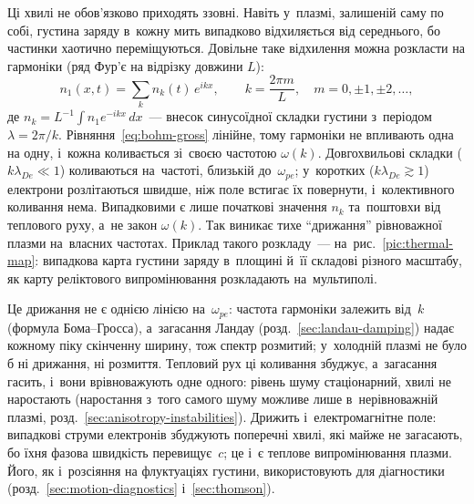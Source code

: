 Ці хвилі не обов'язково приходять ззовні. Навіть у~плазмі, залишеній саму по собі, густина
заряду в~кожну мить випадково відхиляється від середнього, бо частинки хаотично
переміщуються. Довільне таке відхилення можна розкласти на гармоніки (ряд Фур'є на
відрізку довжини $L$):
\begin{equation*}
	n_1(x,t)=\sum_k n_k(t)\,e^{ikx},\qquad k=\frac{2\pi m}{L},\quad m=0,\pm1,\pm2,\dots,
\end{equation*}
де $n_k=L^{-1}\!\int n_1e^{-ikx}\,dx$~--- внесок синусоїдної складки густини з~періодом
$\lambda=2\pi/k$. Рівняння~\eqref{eq:bohm-gross} лінійне, тому гармоніки не впливають одна
на одну, і~кожна коливається зі~своєю частотою $\omega(k)$. Довгохвильові складки
($k\lambda_{De}\ll1$) коливаються на~частоті, близькій до~$\omega_{pe}$; у~коротких
($k\lambda_{De}\gtrsim1$) електрони розлітаються швидше, ніж поле встигає їх повернути, і~колективного
коливання нема. Випадковими є лише початкові значення $n_k$ та~поштовхи від теплового руху,
а~не закон $\omega(k)$. Так виникає тихе \enquote{дрижання} рівноважної плазми на~власних
частотах. Приклад такого розкладу~--- на~рис.~\ref{pic:thermal-map}: випадкова
карта густини заряду в~площині й~її складові різного масштабу, як карту реліктового
випромінювання розкладають на~мультиполі.

Це дрижання не є однією лінією на~$\omega_{pe}$: частота гармоніки залежить від~$k$
(формула Бома--Гросса), а~загасання Ландау (розд.~\ref{sec:landau-damping}) надає кожному
піку скінченну ширину, тож спектр розмитий; у~холодній плазмі не було б ні
дрижання, ні розмиття. Тепловий рух ці коливання збуджує, а~загасання гасить, і~вони
врівноважують одне одного: рівень шуму стаціонарний, хвилі не наростають (наростання з~того
самого шуму можливе лише в~нерівноважній плазмі, розд.~\ref{sec:anisotropy-instabilities}).
Дрижить і~електромагнітне поле: випадкові струми електронів збуджують поперечні хвилі, які
майже не загасають, бо їхня фазова швидкість перевищує~$c$; це і~є теплове випромінювання
плазми. Його, як і~розсіяння на флуктуаціях густини, використовують для діагностики
(розд.~\ref{sec:motion-diagnostics} і~\ref{sec:thomson}).

